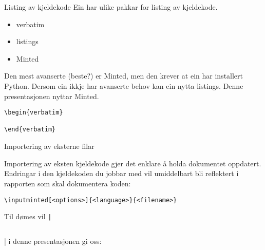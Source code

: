 \begin{frame}[containsverbatim]{Listing av kjeldekode}
	Ein har ulike pakkar for listing av kjeldekode.
	
	\begin{itemize}
		\item verbatim
		\item listings
		\item Minted
	\end{itemize}
	
	Den mest avanserte (beste?) er Minted, men den krever at ein har installert Python. Dersom ein ikkje har avanserte behov kan ein nytta listings. Denne presentasjonen nyttar Minted.
	
	\begin{lstlisting}
\begin{verbatim}
	
\end{verbatim}
	\end{lstlisting}
	
\end{frame}


\begin{frame}[containsverbatim]{Importering av eksterne filar}
	
	Importering av eksten kjeldekode gjer det enklare å holda dokumentet oppdatert. Endringar i den kjeldekoden du jobbar med vil umiddelbart bli reflektert i rapporten som skal dokumentera koden:
	
	\begin{verbatim}
\inputminted[<options>]{<language>}{<filename>}
	\end{verbatim}
	
	Til dømes vil \texttt|\inputminted{csharp}{source-code/hello.cs}| i denne presentasjonen gi oss:
	
	\inputminted{csharp}{source-code/hello.cs}
	
\end{frame}
